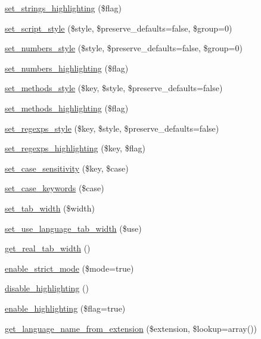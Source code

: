 \begin{DoxyCompactItemize}
\item 
\hyperlink{class_ge_s_hi_ac58f6e232b610394892327bef8e52b90}{set\-\_\-strings\-\_\-highlighting} (\$flag)
\item 
\hyperlink{class_ge_s_hi_a22a3c4b4b3e365950eb28fdd6b332904}{set\-\_\-script\-\_\-style} (\$style, \$preserve\-\_\-defaults=false, \$group=0)
\item 
\hyperlink{class_ge_s_hi_a679efcddc72479c478462dc9a43efc72}{set\-\_\-numbers\-\_\-style} (\$style, \$preserve\-\_\-defaults=false, \$group=0)
\item 
\hyperlink{class_ge_s_hi_a718a54c06d45505b2eb26ce50863f228}{set\-\_\-numbers\-\_\-highlighting} (\$flag)
\item 
\hyperlink{class_ge_s_hi_ad8151b253b76e016d9a5ac85f6b14a12}{set\-\_\-methods\-\_\-style} (\$key, \$style, \$preserve\-\_\-defaults=false)
\item 
\hyperlink{class_ge_s_hi_afd276fde7975a25899a604a6d57e6a8f}{set\-\_\-methods\-\_\-highlighting} (\$flag)
\item 
\hyperlink{class_ge_s_hi_a4aca7660f7faba909bc9a2874ceed037}{set\-\_\-regexps\-\_\-style} (\$key, \$style, \$preserve\-\_\-defaults=false)
\item 
\hyperlink{class_ge_s_hi_a6f7e8905d1faba66bbe95a1933ad9d80}{set\-\_\-regexps\-\_\-highlighting} (\$key, \$flag)
\item 
\hyperlink{class_ge_s_hi_a606ed4c043d9da66a0dcbed7974f4aec}{set\-\_\-case\-\_\-sensitivity} (\$key, \$case)
\item 
\hyperlink{class_ge_s_hi_ab9b657e416699151c5641bf14c5adc86}{set\-\_\-case\-\_\-keywords} (\$case)
\item 
\hyperlink{class_ge_s_hi_a1da1e26794395dc0804c50dd6f7d07a2}{set\-\_\-tab\-\_\-width} (\$width)
\item 
\hyperlink{class_ge_s_hi_a3205931d9628c6e3898397c845556efa}{set\-\_\-use\-\_\-language\-\_\-tab\-\_\-width} (\$use)
\item 
\hyperlink{class_ge_s_hi_ad9b807a0fb6eaaec6459c95f398d349f}{get\-\_\-real\-\_\-tab\-\_\-width} ()
\item 
\hyperlink{class_ge_s_hi_ac21ef1e78dda6bebce4361c186167f59}{enable\-\_\-strict\-\_\-mode} (\$mode=true)
\item 
\hyperlink{class_ge_s_hi_ab068cf775d5f11f1002346897d42af08}{disable\-\_\-highlighting} ()
\item 
\hyperlink{class_ge_s_hi_a15e3ef2c685ab4a68992641ef30a4761}{enable\-\_\-highlighting} (\$flag=true)
\item 
\hyperlink{class_ge_s_hi_aff9441e15e313a587161d6a0a8104622}{get\-\_\-language\-\_\-name\-\_\-from\-\_\-extension} (\$extension, \$lookup=array())

\end{DoxyCompactItemize}
